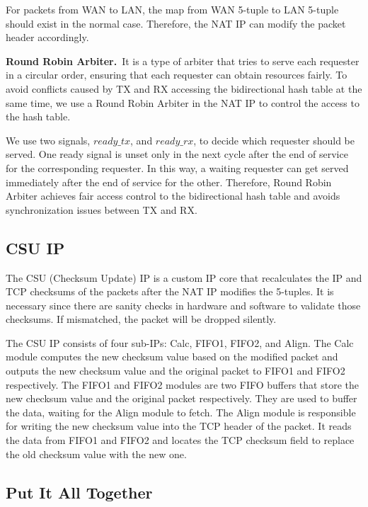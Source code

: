     For packets from WAN to LAN, the map from WAN 5-tuple to LAN 5-tuple should exist in the normal case. Therefore, the NAT IP can modify the packet header accordingly.

    \textbf{Round Robin Arbiter.}\ It is a type of arbiter that tries to serve each requester in a circular order, ensuring that each requester can obtain resources fairly. To avoid conflicts caused by TX and RX accessing the bidirectional hash table at the same time, we use a Round Robin Arbiter in the NAT IP to control the access to the hash table. 

    We use two signals, $ready\_tx$, and $ready\_rx$, to decide which requester should be served. One ready signal is unset only in the next cycle after the end of service for the corresponding requester. In this way, a waiting requester can get served immediately after the end of service for the other. Therefore, Round Robin Arbiter achieves fair access control to the bidirectional hash table and avoids synchronization issues between TX and RX.
    
\subsection{CSU IP}
    The CSU (Checksum Update) IP is a custom IP core that recalculates the IP and TCP checksums of the packets after the NAT IP modifies the 5-tuples. It is necessary since there are sanity checks in hardware and software to validate those checksums. If mismatched, the packet will be dropped silently. 
    
    The CSU IP consists of four sub-IPs: Calc, FIFO1, FIFO2, and Align. 
    The Calc module computes the new checksum value based on the modified packet and outputs the new checksum value and the original packet to FIFO1 and FIFO2 respectively.
    The FIFO1 and FIFO2 modules are two FIFO buffers that store the new checksum value and the original packet respectively. They are used to buffer the data, waiting for the Align module to fetch. 
    The Align module is responsible for writing the new checksum value into the TCP header of the packet. It reads the data from FIFO1 and FIFO2 and locates the TCP checksum field to replace the old checksum value with the new one.


\subsection{Put It All Together}
